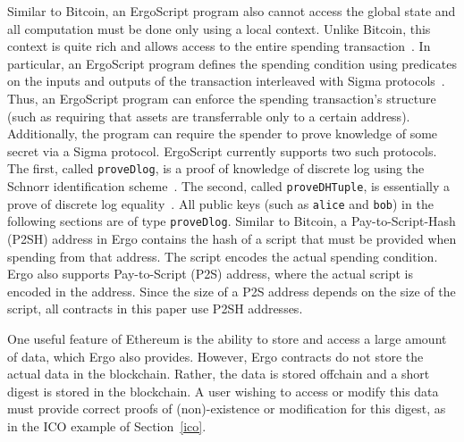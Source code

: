 \documentclass[runningheads]{llncs}
\newcommand{\langname}{ErgoScript\xspace}
\begin{document}
Similar to Bitcoin, an \langname program also cannot access the global state and all computation must be done only using a local context. Unlike Bitcoin, this context is quite rich and allows access to the entire spending transaction~\cite{tutorial}. 
In particular, an \langname program defines the spending condition using predicates on the inputs and outputs of the transaction interleaved with Sigma protocols~\cite{Dam10}. Thus, an \langname program can enforce the spending transaction's structure (such as requiring that assets are transferrable only to a certain address). Additionally, the program can require the spender to prove knowledge of some secret via a Sigma protocol. \langname currently supports two such protocols. The first, called \texttt{proveDlog}, is a proof of knowledge of discrete log using the Schnorr identification scheme~\cite{Dam10}. The second, called \texttt{proveDHTuple}, is essentially a prove of discrete log equality~\cite{advtutorial}. All public keys (such as \texttt{alice} and \texttt{bob}) in the following sections are of type \texttt{proveDlog}. Similar to Bitcoin, a Pay-to-Script-Hash (P2SH) address in Ergo contains the hash of a script that must be provided when spending from that address. The script encodes the actual spending condition. Ergo also supports Pay-to-Script (P2S) address, where the actual script is encoded in the address. Since the size of a P2S address depends on the size of the script, all contracts in this paper use P2SH addresses.


 
 One useful feature of Ethereum is the ability to store and access a large amount of data, which Ergo also provides.
 However, Ergo contracts do not store the actual data in the blockchain. Rather, the data is stored offchain and a short digest is stored in the blockchain. A user wishing to access or modify this data must provide correct proofs of (non)-existence or modification for this digest, as in the ICO example of Section~\ref{ico}. 
\end{document}
